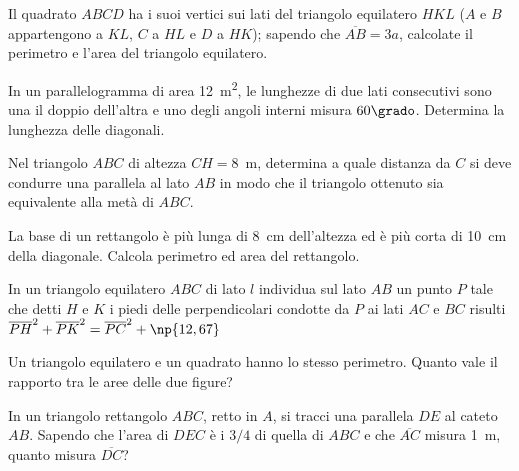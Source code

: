 \begin{multicols}{2}
\begin{esercizio}
\label{ese:7.35}
Il quadrato \(ABCD\) ha i suoi vertici sui lati del triangolo 
equilatero \(HKL\) (\(A\) e \(B\) appartengono a \(KL\), \(C\) a \(HL\) e \(D\) a 
\(HK\)); sapendo che \(\overline{AB}=3a\), calcolate il perimetro e l'area 
del triangolo equilatero.
\end{esercizio}

\begin{esercizio}
\label{ese:7.36}
In un parallelogramma di area 12~m\textsuperscript{2}, le lunghezze 
di due lati consecutivi sono una il doppio dell'altra e uno degli 
angoli interni misura \(60\grado\). Determina la lunghezza delle 
diagonali.
\end{esercizio}

\begin{esercizio}
\label{ese:7.37}
Nel triangolo \(ABC\) di altezza \(CH=8\)~m, determina a quale distanza 
da \(C\) si deve condurre una parallela al lato \(AB\) in modo che il 
triangolo ottenuto sia equivalente alla metà di \(ABC\).
\end{esercizio}

\begin{esercizio}
\label{ese:7.38}
La base di un rettangolo è più lunga di 8~cm dell'altezza ed è più 
corta di 10~cm della diagonale. Calcola perimetro ed area del 
rettangolo. 			
\end{esercizio}

\begin{esercizio}
\label{ese:7.39}
In un triangolo equilatero \(ABC\) di lato \(l\) individua sul lato \(AB\) 
un punto \(P\) tale che detti \(H\) e \(K\) i piedi delle perpendicolari 
condotte da \(P\) ai lati \(AC\) e \(BC\) risulti 
\(\overline{PH}^2+\overline{PK}^2=\overline{PC}^2+\np{12,67}\)
\end{esercizio}

\begin{esercizio}
\label{ese:7.40}
Un triangolo equilatero e un quadrato hanno lo stesso perimetro. 
Quanto vale il rapporto tra le aree delle due figure?
\end{esercizio}

\begin{esercizio}
\label{ese:7.41}
In un triangolo rettangolo \(ABC\), retto in \(A\), si tracci una 
parallela \(DE\) al cateto \(AB\). Sapendo che l'area di \(DEC\) è i \(3/4\) 
di quella di \(ABC\) e che \(\overline{AC}\) misura 1~m, quanto misura 
\(\overline{DC}\)?
\end{esercizio}


\end{multicols}
